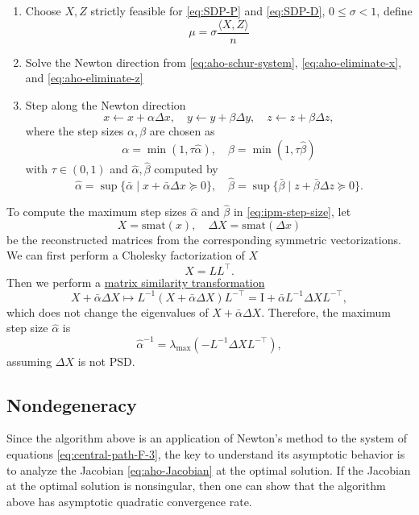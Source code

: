 \documentclass[
]{book}
\theoremstyle{definition}
\theoremstyle{definition}
\theoremstyle{definition}
\theoremstyle{definition}
\theoremstyle{remark}
\begin{document}
\begin{enumerate}
\def\labelenumi{\arabic{enumi}.}
\item
  Choose \(X,Z\) strictly feasible for \eqref{eq:SDP-P} and \eqref{eq:SDP-D}, \(0 \leq \sigma < 1\), define
  \[
  \mu = \sigma \frac{\langle X, Z \rangle}{n}
  \]
\item
  Solve the Newton direction from \eqref{eq:aho-schur-system}, \eqref{eq:aho-eliminate-x}, and \eqref{eq:aho-eliminate-z}
\item
  Step along the Newton direction
  \[
  x \leftarrow x + \alpha \Delta x, \quad y \leftarrow y + \beta \Delta y, \quad z \leftarrow z + \beta \Delta z,
  \]
  where the step sizes \(\alpha, \beta\) are chosen as
  \[
  \alpha = \min (1, \tau \hat{\alpha}), \quad \beta = \min (1, \tau \hat{\beta})
  \]
  with \(\tau \in (0,1)\) and \(\hat{\alpha}, \hat{\beta}\) computed by
  \begin{equation}
  \hat{\alpha} = \sup \{ \bar{\alpha} \mid x + \bar{\alpha} \Delta x \succeq 0  \}, \quad \hat{\beta} = \sup \{ \bar{\beta} \mid z + \bar{\beta} \Delta z \succeq 0  \}.
  \label{eq:ipm-step-size}
  \end{equation}
\end{enumerate}

To compute the maximum step sizes \(\hat{\alpha}\) and \(\hat{\beta}\) in \eqref{eq:ipm-step-size}, let
\[
X = \mathrm{smat}(x), \quad \Delta X = \mathrm{smat}(\Delta x)
\]
be the reconstructed matrices from the corresponding symmetric vectorizations. We can first perform a Cholesky factorization of \(X\)
\[
X = LL^\top.
\]
Then we perform a \href{https://en.wikipedia.org/wiki/Matrix_similarity}{matrix similarity transformation}
\[
X + \bar{\alpha} \Delta X \mapsto L^{-1}(X + \bar{\alpha} \Delta X) L^{-\top} = \mathrm{I}+ \bar{\alpha} L^{-1}\Delta X L^{-\top},
\]
which does not change the eigenvalues of \(X + \bar{\alpha} \Delta X\). Therefore, the maximum step size \(\hat{\alpha}\) is
\[
\hat{\alpha}^{-1}= \lambda_{\max}(- L^{-1}\Delta X L^{-\top}),
\]
assuming \(\Delta X\) is not PSD.

\subsection{Nondegeneracy}\label{nondegeneracy}

Since the algorithm above is an application of Newton's method to the system of equations \eqref{eq:central-path-F-3}, the key to understand its asymptotic behavior is to analyze the Jacobian \eqref{eq:aho-Jacobian} at the optimal solution. If the Jacobian at the optimal solution is nonsingular, then one can show that the algorithm above has asymptotic quadratic convergence rate.
\end{document}
